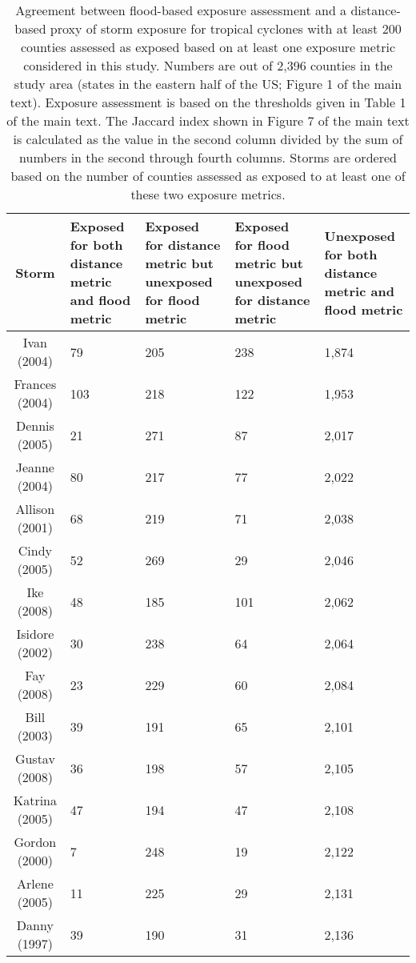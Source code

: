 \begin{table}[ht]
\centering
\caption{Agreement between flood-based exposure assessment and a distance-based
         proxy of storm exposure for tropical cyclones with at least 200 counties assessed 
         as exposed based on at least one exposure metric considered in this study. Numbers 
         are out of 2,396 counties in the study area (states in the eastern half of the US; 
         Figure 1 of the main text). Exposure assessment is based on the thresholds given in 
         Table 1 of the main text. The Jaccard index shown in Figure 7 of the main text is 
         calculated as the value in the second column divided by the sum of numbers in the 
         second through fourth columns.  Storms are ordered based on the number of counties 
         assessed as exposed to at least one of these two exposure metrics.} 
\label{tab:misclassflood}
\begin{tabular}{cP{3cm}P{3cm}P{3cm}P{3cm}}
  \toprule
Storm & Exposed for both distance metric and flood metric & Exposed for distance metric but unexposed for flood metric & Exposed for flood metric but unexposed for distance metric & Unexposed for both distance metric and flood metric \\ 
  \midrule
Ivan (2004) & 79 & 205 & 238 & 1,874 \\ 
  Frances (2004) & 103 & 218 & 122 & 1,953 \\ 
  Dennis (2005) & 21 & 271 & 87 & 2,017 \\ 
  Jeanne (2004) & 80 & 217 & 77 & 2,022 \\ 
  Allison (2001) & 68 & 219 & 71 & 2,038 \\ 
  Cindy (2005) & 52 & 269 & 29 & 2,046 \\ 
  Ike (2008) & 48 & 185 & 101 & 2,062 \\ 
  Isidore (2002) & 30 & 238 & 64 & 2,064 \\ 
  Fay (2008) & 23 & 229 & 60 & 2,084 \\ 
  Bill (2003) & 39 & 191 & 65 & 2,101 \\ 
  Gustav (2008) & 36 & 198 & 57 & 2,105 \\ 
  Katrina (2005) & 47 & 194 & 47 & 2,108 \\ 
  Gordon (2000) & 7 & 248 & 19 & 2,122 \\ 
  Arlene (2005) & 11 & 225 & 29 & 2,131 \\ 
  Danny (1997) & 39 & 190 & 31 & 2,136 \\ 

\end{tabular}
\end{table}
